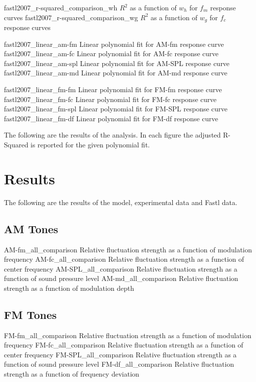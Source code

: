 \documentclass{article}
\begin{document}
\myfigurepair%
  {fastl2007_r-squared_comparison_wh}
  {$R^2$ as a function of $w_h$ for $f_m$ response curves}
  {fastl2007_r-squared_comparison_wg}
  {$R^2$ as a function of $w_g$ for $f_c$ response curves}

\myfigurequad%
  {fastl2007_linear_am-fm}
  {Linear polynomial fit for AM-fm response curve}
  {fastl2007_linear_am-fc}
  {Linear polynomial fit for AM-fc response curve}
  {fastl2007_linear_am-spl}
  {Linear polynomial fit for AM-SPL response curve}
  {fastl2007_linear_am-md}
  {Linear polynomial fit for AM-md response curve}

\myfigurequad%
  {fastl2007_linear_fm-fm}
  {Linear polynomial fit for FM-fm response curve}
  {fastl2007_linear_fm-fc}
  {Linear polynomial fit for FM-fc response curve}
  {fastl2007_linear_fm-spl}
  {Linear polynomial fit for FM-SPL response curve}
  {fastl2007_linear_fm-df}
  {Linear polynomial fit for FM-df response curve}

The following are the results of the analysis. In each figure the adjusted
R-Squared is reported for the given polynomial fit.

\section{Results}
\label{sec:results}

The following are the results of the model, experimental data and Fastl data.

\begin{comparison}

\subsection{AM Tones}
\label{subsec:results_am_tones}

\myfigurequad%
  {AM-fm_all_comparison}
  {Relative fluctuation strength as a function of modulation frequency}
  {AM-fc_all_comparison}
  {Relative fluctuation strength as a function of center frequency}
  {AM-SPL_all_comparison}
  {Relative fluctuation strength as a function of sound pressure level}
  {AM-md_all_comparison}
  {Relative fluctuation strength as a function of modulation depth}

\subsection{FM Tones}
\label{subsec:results_fm_tones}

\myfigurequad%
  {FM-fm_all_comparison}
  {Relative fluctuation strength as a function of modulation frequency}
  {FM-fc_all_comparison}
  {Relative fluctuation strength as a function of center frequency}
  {FM-SPL_all_comparison}
  {Relative fluctuation strength as a function of sound pressure level}
  {FM-df_all_comparison}
  {Relative fluctuation strength as a function of frequency deviation}

\end{comparison}
\end{document}
